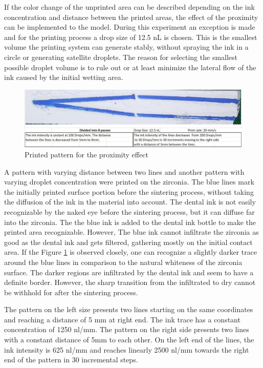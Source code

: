 If the color change of the unprinted area can be described depending on the ink concentration and distance between the printed areas, the effect of the proximity can be implemented to the model. During this experiment an exception is made and for the printing process a drop size of 12.5 nL is chosen. This is the smallest volume the printing system can generate stably, without spraying the ink in a circle or generating satellite droplets. The reason for selecting the smallest possible droplet volume is to rule out or at least minimize the lateral flow of the ink caused by the initial wetting area.  

\bigskip

\begin{figure}[H]
	\centering
	\includegraphics[width=1\textwidth]{grafiken/proximityprint.jpg}
	\caption{Printed pattern for the proximity effect}
	\label{fig:proximityprint}
\end{figure} 

\bigskip

A pattern with varying distance between two lines and another pattern with varying droplet concentration were printed on the zirconia. The blue lines mark the initially printed surface portion before the sintering process, without taking the diffusion of the ink in the material into account. The dental ink is not easily recognizable by the naked eye before the sintering process, but it can diffuse far into the zirconia. The the blue ink is added to the dental ink bottle to make the printed area recognizable. However, The blue ink cannot infiltrate the zirconia as good as the dental ink and gets filtered, gathering mostly on the initial contact area. If the Figure \ref{fig:proximityprint} is observed closely, one can recognize a slightly darker trace around the blue lines in comparison to the natural whiteness of the zirconia surface. The darker regions are infiltrated by the dental ink and seem to have a definite border. However, the sharp transition from the infiltrated to dry cannot be withhold for after the sintering process.

The pattern on the left size presents two lines starting on the same coordinates and reaching a distance of 5 mm at right end. The ink trace has a constant concentration of 1250 nl/mm. The pattern on the right side presents two lines with a constant distance of 5mm to each other. On the left end of the lines, the ink intensity is 625 nl/mm and reaches linearly 2500 nl/mm towards the right end of the pattern in 30 incremental steps.

